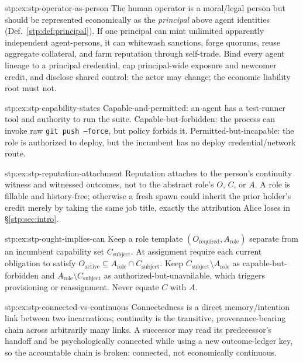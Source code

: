\begin{pdSolution}{stp:ex:stp-operator-as-person}
The human operator is a moral/legal person but should be represented
economically as the \emph{principal} above agent identities
(Def.~\ref{stp:def:principal}). If one principal can mint unlimited apparently
independent agent-persons, it can whitewash sanctions, forge quorums, reuse
aggregate collateral, and farm reputation through self-trade. Bind every agent
lineage to a principal credential, cap principal-wide exposure and newcomer
credit, and disclose shared control: the actor may change; the economic
liability root must not.
\end{pdSolution}
\begin{pdSolution}{stp:ex:stp-capability-states}
Capable-and-permitted: an agent has a test-runner tool and authority to run
the suite. Capable-but-forbidden: the process can invoke raw
\texttt{git push --force}, but policy forbids it. Permitted-but-incapable: the
role is authorized to deploy, but the incumbent has no deploy
credential/network route.
\end{pdSolution}
\begin{pdSolution}{stp:ex:stp-reputation-attachment}
Reputation attaches to the person's continuity witness and witnessed outcomes,
not to the abstract role's $O$, $C$, or $A$. A role is fillable and
history-free; otherwise a fresh spawn could inherit the prior holder's credit
merely by taking the same job title, exactly the attribution Alice loses in
\S\ref{stp:sec:intro}.
\end{pdSolution}
\begin{pdSolution}{stp:ex:stp-ought-implies-can}
Keep a role template $(O_{\text{required}}, A_{\text{role}})$ separate from an
incumbent capability set $C_{\text{subject}}$. At assignment require each
current obligation to satisfy
$O_{\text{active}} \subseteq A_{\text{role}} \cap C_{\text{subject}}$. Keep
$C_{\text{subject}} \setminus A_{\text{role}}$ as capable-but-forbidden and
$A_{\text{role}} \setminus C_{\text{subject}}$ as authorized-but-unavailable,
which triggers provisioning or reassignment. Never equate $C$ with $A$.
\end{pdSolution}
\begin{pdSolution}{stp:ex:stp-connected-vs-continuous}
Connectedness is a direct memory/intention link between two incarnations;
continuity is the transitive, provenance-bearing chain across arbitrarily many
links. A successor may read its predecessor's handoff and be psychologically
connected while using a new outcome-ledger key, so the accountable chain is
broken: connected, not economically continuous.
\end{pdSolution}
